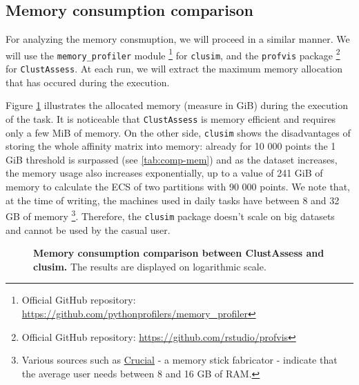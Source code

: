 \subsection{Memory consumption comparison}
For analyzing the memory consmuption, we will proceed in a similar manner. We will use the \verb|memory_profiler| module \footnote{Official GitHub repository: \url{https://github.com/pythonprofilers/memory_profiler}} for \verb|clusim|, and the \verb|profvis| package \footnote{Official GitHub repository: \url{https://github.com/rstudio/profvis}} for \verb|ClustAssess|. At each run, we will extract the maximum memory allocation that has occured during the execution.

Figure \ref{fig:comp-mem} illustrates the allocated memory (measure in GiB) during the execution of the task. It is noticeable that \verb|ClustAssess| is memory efficient and requires only a few MiB of memory. On the other side, \verb|clusim| shows the disadvantages of storing the whole affinity matrix into memory: already for 10 000 points the 1 GiB threshold is surpassed (see \ref{tab:comp-mem}) and as the dataset increases, the memory usage also increases exponentially, up to a value of 241 GiB of memory to calculate the ECS of two partitions with 90 000 points.
We note that, at the time of writing, the machines used in daily tasks have between 8 and 32 GB of memory \footnote{Various sources such as \href{https://www.crucial.com/articles/about-memory/how-much-ram-does-my-computer-need}{Crucial} - a memory stick fabricator - indicate that the average user needs between 8 and 16 GB of RAM.}. Therefore, the \verb|clusim| package doesn't scale on big datasets and cannot be used by the casual user.

\begin{figure}[H]
    \centering
    \caption{\label{fig:comp-mem}\textbf{Memory consumption comparison between ClustAssess and clusim.} The results are displayed on logarithmic scale.}
\end{figure}


